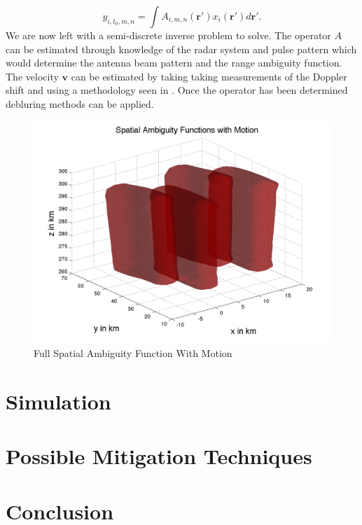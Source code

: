 \documentclass[10pt]{article}
\begin{document}
\begin{equation}
\label{eqn:L6}
y_{i,t_0,m,n}= \int A_{i,m,n}(\mathbf{r}') x_i(\mathbf{r}')d\mathbf{r}'.
\end{equation}
\noindent We are now left with a semi-discrete inverse problem to solve. The operator $A$ can be estimated through knowledge of the radar system and pulse pattern which would determine the antenna beam pattern and the range ambiguity function. The velocity $\mathbf{v}$ can be estimated by taking taking measurements of the Doppler shift and using a methodology seen in \cite{butler:imagingfregiondrifts}. Once the operator has been determined debluring methods can be applied.



\begin{figure}[!t]
	\centering
	\includegraphics[width=5.5in]{spaceambmoving}
	\caption{Full Spatial Ambiguity Function With Motion}
	\label{fig:chain}
\end{figure}

\section{Simulation}
\section{Possible Mitigation Techniques}
\section{Conclusion}


\end{document}
